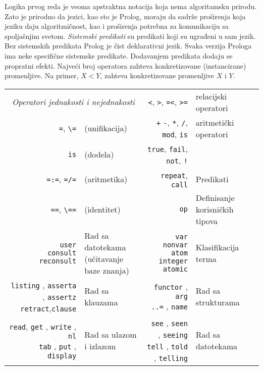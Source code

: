 \documentclass[../main.tex]{subfiles}
\begin{document}
Logika prvog reda je veoma apstraktna notacija koja nema algoritamsku prirodu. Zato je prirodno da jezici, kao sto je Prolog, moraju da sadrže proširenja koja jeziku daju algoritmičnost, kao i proširenja potrebna za komunikaciju sa spoljašnjim svetom.
{\it Sistemski predikati} su predikati koji su ugrađeni u sam jezik.
\\
Bez sistemskih predikata Prolog je čist deklarativni jezik. Svaka verzija Prologa ima neke specifične sistemske predikate. Dodavanjem predikata dodaju se propratni efekti. Najveći broj operatora zahteva konkretizovane (instancirane) promenljive. Na primer, $X<Y$, zahteva konkretizovane promenljive $X$ i $Y$.
\\
\begin{center}
{\renewcommand{\arraystretch}{1.2} %
\begin{tabular}{rl||rl} %
\multicolumn{2}{c||}{\it Operatori jednakosti i nejednakosti} 
& \texttt{<}, \texttt{>}, \texttt{=<}, \texttt{>=} 
& relacijski operatori 
 \\
\texttt{=}, \texttt{\textbackslash=}  
& (unifikacija)
&\texttt{+} \texttt{-}, \texttt{*}, \texttt{/}, \texttt{mod}, \texttt{is} 
& aritmetički operatori	
\\
\texttt{is} 	
& (dodela)	
&\texttt{true}, \texttt{fail}, \texttt{not}, \texttt{!} 	
&	\\
\texttt{=:=}, \texttt{=/=}	
& (aritmetika)	
& \texttt{repeat}, \texttt{call}
& Predikati
\\
\texttt{==}, \texttt{\textbackslash==} 
& (identitet)
& \texttt{op}
& Definisanje korisničkih tipova
\\
\hline

\makecell[r]{\texttt{user} \\ \texttt{consult}\\ \texttt{reconsult}} 
& \makecell[l]{Rad sa datotekama \\ (učitavanje baze znanja)} 
& \makecell[r]{\texttt{var} \\ \texttt{nonvar} \\ \texttt{atom} \\ \texttt{integer} \\ \texttt{atomic}}
&Klasifikacija terma 
\\
 
 \hline
 
 \makecell[r]{\texttt{listing} , \texttt{asserta} , \texttt{assertz} \\ \texttt{retract},\texttt{clause}} 
 & Rad sa klauzama 
 & \makecell[r]{\texttt{functor} , \texttt{arg} \\ \texttt{..=} , \texttt{name}}
 & Rad sa strukturama
\\
\hline
\makecell[r]{\texttt{read}, \texttt{get} , \texttt{write} , \texttt{nl} \\ \texttt{tab} , \texttt{put} , \texttt{display} }
& Rad sa ulazom i izlazom
& \makecell[r]{\texttt{see} , \texttt{seen} , \texttt{seeing} \\ \texttt{tell} , \texttt{told} , \texttt{telling}}
& Rad sa datotekama
\end{tabular}}
\end{center}
\end{document}

